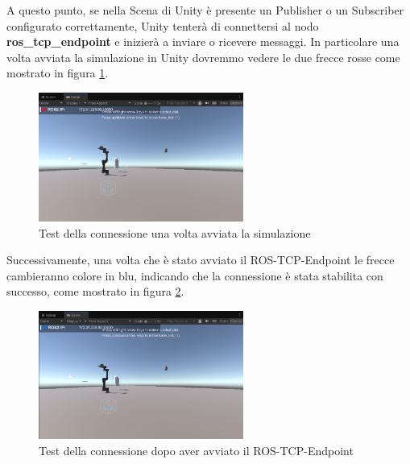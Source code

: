 \documentclass[11pt]{report}
\begin{document}
A questo punto, se nella Scena di Unity è presente un Publisher o un Subscriber configurato correttamente, Unity tenterà di connettersi al nodo \textbf{ros\_tcp\_endpoint} e inizierà a inviare o ricevere messaggi.
In particolare una volta avviata la simulazione in Unity dovremmo vedere le due frecce rosse come mostrato in figura \ref{fig:test_connessione_1}.

\begin{figure}[H]
    \centering
    \includegraphics[width=0.6\textwidth]{images/test_connessione_1.PNG}
    \caption{Test della connessione una volta avviata la simulazione}
    \label{fig:test_connessione_1}
\end{figure}

Successivamente, una volta che è stato avviato il ROS-TCP-Endpoint le frecce cambieranno colore in blu, indicando che la connessione è stata stabilita con successo, come mostrato in figura \ref{fig:test_connessione_2}.

\begin{figure}[H]
    \centering
    \includegraphics[width=0.6\textwidth]{images/test_connessione_2.PNG}
    \caption{Test della connessione dopo aver avviato il ROS-TCP-Endpoint}
    \label{fig:test_connessione_2}
\end{figure}

\end{document}
